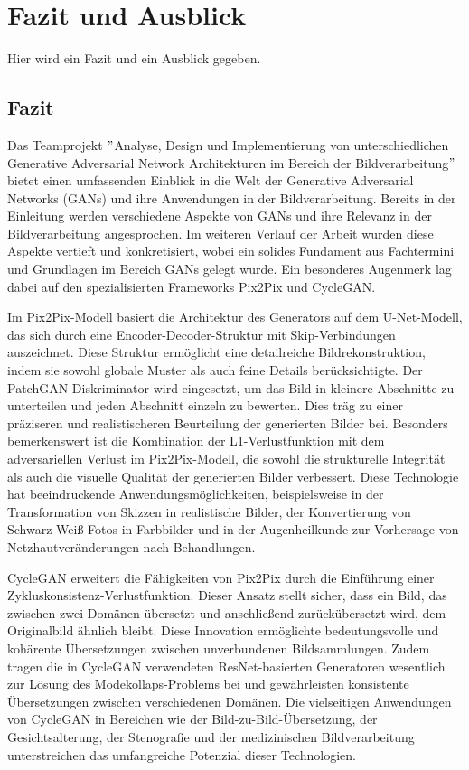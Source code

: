 \chapter{Fazit und Ausblick}
Hier wird ein Fazit und ein Ausblick gegeben.

\section{Fazit}
Das Teamprojekt $"$Analyse, Design und Implementierung von unterschiedlichen Generative Adversarial Network Architekturen im Bereich der Bildverarbeitung$"$ bietet einen umfassenden Einblick in die Welt der Generative Adversarial Networks (GANs) und ihre Anwendungen in der Bildverarbeitung. Bereits in der Einleitung werden verschiedene Aspekte von GANs und ihre Relevanz in der Bildverarbeitung angesprochen. Im weiteren Verlauf der Arbeit wurden diese Aspekte vertieft und konkretisiert, wobei ein solides Fundament aus Fachtermini und Grundlagen im Bereich GANs gelegt wurde. Ein besonderes Augenmerk lag dabei auf den spezialisierten Frameworks Pix2Pix und CycleGAN.

Im Pix2Pix-Modell basiert die Architektur des Generators auf dem U-Net-Modell, das sich durch eine Encoder-Decoder-Struktur mit Skip-Verbindungen auszeichnet. Diese Struktur ermöglicht eine detailreiche Bildrekonstruktion, indem sie sowohl globale Muster als auch feine Details berücksichtigte. Der PatchGAN-Diskriminator wird eingesetzt, um das Bild in kleinere Abschnitte zu unterteilen und jeden Abschnitt einzeln zu bewerten. Dies träg zu einer präziseren und realistischeren Beurteilung der generierten Bilder bei. Besonders bemerkenswert ist die Kombination der L1-Verlustfunktion mit dem adversariellen Verlust im Pix2Pix-Modell, die sowohl die strukturelle Integrität als auch die visuelle Qualität der generierten Bilder verbessert. Diese Technologie hat beeindruckende Anwendungsmöglichkeiten, beispielsweise in der Transformation von Skizzen in realistische Bilder, der Konvertierung von Schwarz-Weiß-Fotos in Farbbilder und in der Augenheilkunde zur Vorhersage von Netzhautveränderungen nach Behandlungen.

CycleGAN erweitert die Fähigkeiten von Pix2Pix durch die Einführung einer Zykluskonsistenz-Verlustfunktion. Dieser Ansatz stellt sicher, dass ein Bild, das zwischen zwei Domänen übersetzt und anschließend zurückübersetzt wird, dem Originalbild ähnlich bleibt. Diese Innovation ermöglichte bedeutungsvolle und kohärente Übersetzungen zwischen unverbundenen Bildsammlungen. Zudem tragen die in CycleGAN verwendeten ResNet-basierten Generatoren wesentlich zur Lösung des Modekollaps-Problems bei und gewährleisten konsistente Übersetzungen zwischen verschiedenen Domänen. Die vielseitigen Anwendungen von CycleGAN in Bereichen wie der Bild-zu-Bild-Übersetzung, der Gesichtsalterung, der Stenografie und der medizinischen Bildverarbeitung unterstreichen das umfangreiche Potenzial dieser Technologien.

